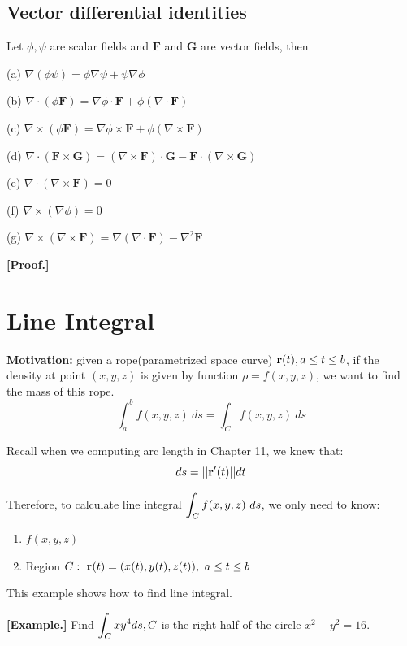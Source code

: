 \documentclass[11pt, a4paper]{MATH2023}
\newcommand{\eg}{\textbf{[Example.] }}
\newcommand{\rr}{{\bf r}}
\begin{document}
\begin{spacing}{1.3}
    \newpage
    \subsection{Vector differential identities}
    Let $\phi, \psi$ are scalar fields and $\mathbf{F}$ and $\mathbf{G}$ are vector fields, then

    (a) $\nabla(\phi \psi)=\phi \nabla \psi+\psi \nabla \phi$

    (b) $\nabla \cdot(\phi \mathbf{F})=\nabla \phi \cdot \mathbf{F}+\phi(\nabla \cdot \mathbf{F})$

    (c) $\nabla \times(\phi \mathbf{F})=\nabla \phi \times \mathbf{F}+\phi(\nabla \times \mathbf{F})$

    (d) $\nabla \cdot(\mathbf{F} \times \mathbf{G})=(\nabla \times \mathbf{F}) \cdot \mathbf{G}-\mathbf{F} \cdot(\nabla \times \mathbf{G})$
    
    (e) $\nabla \cdot(\nabla \times \mathbf{F})=0$
    
    (f) $\nabla \times(\nabla \phi)=0$
    
    (g) $\nabla \times(\nabla \times \mathbf{F})=\nabla(\nabla \cdot \mathbf{F})-\nabla^{2} \mathbf{F}$

    \vspace{0.2in}
    {\bf [Proof.]}



    \newpage
    \section{Line Integral}
    {\bf Motivation:} given a rope(parametrized space curve) $\rr(t), a\le t\le b$, if the density at 
    point $(x,y,z)$ is given by function $\rho =f(x,y,z)$, we want to find the mass of this rope.
    $$\int_a^b f(x,y,z)\ ds=\int_C f(x,y,z)\ ds$$

    Recall when we computing arc length in Chapter 11, we knew that: 
    $$ds=||\rr'(t)|| dt$$

    Therefore, to calculate line integral $\displaystyle \int_C f(x,y,z)\ ds$, we only need to know: 
    \begin{enumerate}
        \item $f(x,y,z)$
        \item Region $C:\ \rr(t)=(x(t), y(t), z(t)),\ a\le t\le b$
    \end{enumerate}

    {\blue This example shows how to find line integral.}

    \eg Find $\displaystyle \int_{C} x y^{4} d s, C$ is the right half of the circle $x^{2}+y^{2}=16$.


\end{spacing}
\end{document}
